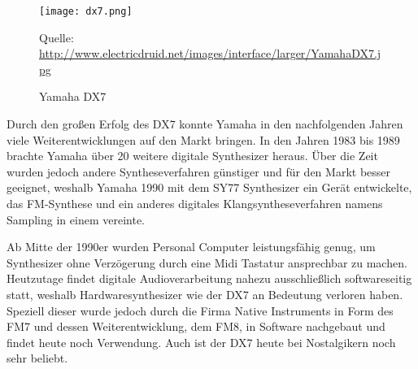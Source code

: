  \begin{figure} [ht]
\centering
  \texttt{[image: dx7.png]}
\caption{Yamaha DX7}
\label{fig:dx7}
Quelle: \url{http://www.electricdruid.net/images/interface/larger/YamahaDX7.jpg}
\end{figure}

Durch den großen Erfolg des DX7 konnte Yamaha in den nachfolgenden Jahren viele Weiterentwicklungen auf den Markt bringen. In den Jahren 1983 bis 1989 brachte Yamaha über 20 weitere digitale Synthesizer heraus. Über die Zeit wurden jedoch andere Syntheseverfahren günstiger und für den Markt besser geeignet, weshalb Yamaha 1990 mit dem SY77 Synthesizer ein Gerät entwickelte, das FM-Synthese und ein anderes digitales Klangsyntheseverfahren namens Sampling in einem vereinte.\cite{fmGS1}

Ab Mitte der 1990er wurden Personal Computer leistungsfähig genug, um Synthesizer ohne Verzögerung durch eine Midi Tastatur ansprechbar zu machen. Heutzutage findet digitale Audioverarbeitung nahezu ausschließlich softwareseitig statt, weshalb Hardwaresynthesizer wie der DX7 an Bedeutung verloren haben. Speziell dieser wurde jedoch durch die Firma Native Instruments in Form des FM7 und dessen Weiterentwicklung, dem FM8, in Software nachgebaut und findet heute noch Verwendung. Auch ist der DX7 heute bei Nostalgikern noch sehr beliebt.\cite{fmGS1}